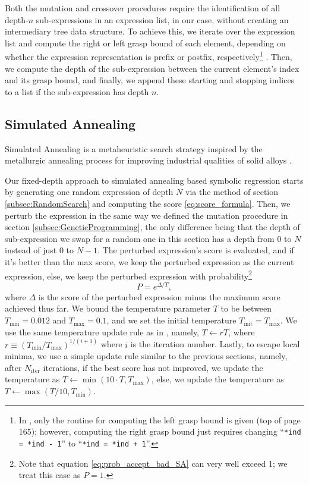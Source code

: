 \documentclass[runningheads]{llncs}
\begin{document}
\par Both the mutation and crossover procedures require the identification of all depth-$n$ sub-expressions in an expression list, in our case, without creating an intermediary tree data structure. To achieve this, we iterate over the expression list and compute the right or left grasp bound of each element, depending on whether the expression representation is prefix or postfix, respectively\footnote{In \cite{3ce09117-c08b-3ddb-b2ba-3ea8005b2118}, only the routine for computing the left grasp bound is given (top of page 165); however, computing the right grasp bound just requires changing ``\texttt{*ind = *ind - 1}'' to ``\texttt{*ind = *ind + 1}''.} \cite{3ce09117-c08b-3ddb-b2ba-3ea8005b2118}. Then, we compute the depth of the sub-expression between the current element's index and its grasp bound, and finally, we append these starting and stopping indices to a list if the sub-expression has depth $n$.

\subsection{Simulated Annealing} \label{subsec:SimulatedAnnealing}
Simulated Annealing is a metaheuristic search strategy inspired by the metallurgic annealing process for improving industrial qualities of solid alloys \cite{vanLaarhoven1987} \cite{10.1145/3449639.3459345}. 
\par Our fixed-depth approach to simulated annealing based symbolic regression starts by generating one random expression of depth $N$ via the method of section \ref{subsec:RandomSearch} and computing the score \ref{eq:score_formula}. Then, we perturb the expression in the same way we defined the mutation procedure in section \ref{subsec:GeneticProgramming}, the only difference being that the depth of sub-expression we swap for a random one in this section has a depth from $0$ to $N$ instead of just $0$ to $N-1$. The perturbed expression's score is evaluated, and if it's better than the max score, we keep the perturbed expression as the current expression, else, we keep the perturbed expression with probability\footnote{Note that equation \ref{eq:prob_accept_bad_SA} can very well exceed 1; we treat this case as $P=1$.} \cite{10.1145/3449639.3459345}
\begin{equation}
		P = e^{\Delta/T},  \label{eq:prob_accept_bad_SA}
\end{equation}
where $\Delta$ is the score of the perturbed expression minus the maximum score achieved thus far. We bound the temperature parameter $T$ to be between $T_{\mathrm{min}} = 0.012$ and $T_{\mathrm{max}} = 0.1$, and we set the initial temperature $T_{\mathrm{init}} = T_{\mathrm{max}}$. We use the same temperature update rule as in \cite{10.1145/3449639.3459345}, namely, $T \gets rT$, where $r \equiv \left(T_{\mathrm{min}}/T_{\mathrm{max}}\right)^{1/(i+1)}$ where $i$ is the iteration number. Lastly, to escape local minima, we use a simple update rule similar to the previous sections, namely, after $N_{\mathrm{iter}}$ iterations, if the best score has not improved, we update the temperature as $T \gets \min{\left(10\cdot T, T_{\mathrm{max}}\right)}$, else, we update the temperature as $T \gets \max{\left(T/10, T_{\mathrm{min}}\right)}$.
\end{document}
